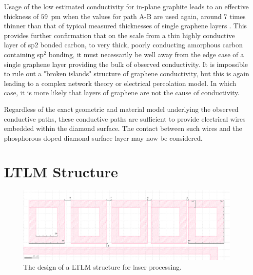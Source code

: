 \begin{refsection}
Usage of the low estimated conductivity for in-plane graphite leads to an effective thickness of $59$~\si{\pico\metre} when the values for path A-B are used again, around 7 times thinner than that of typical measured thicknesses of single graphene layers \cite{shearer2016}. This provides further confirmation that on the scale from a thin highly conductive layer of sp${2}$ bonded carbon, to very thick, poorly conducting amorphous carbon containing sp$^{2}$ bonding, it must necessarily be well away from the edge case of a single graphene layer providing the bulk of observed conductivity. It is impossible to rule out a "broken islands" structure of graphene conductivity, but this is again leading to a complex network theory or electrical percolation model. In which case, it is more likely that layers of graphene are not the cause of conductivity.

Regardless of the exact geometric and material model underlying the observed conductive paths, these conductive paths are sufficient to provide electrical wires embedded within the diamond surface. The contact between such wires and the phosphorous doped diamond surface layer may now be considered.

\section{LTLM Structure}

\begin{figure}[H]
    \centering
    \includegraphics[width=\linewidth]{Chapter7/Figs/Raster/ltlm_design.png}
    \caption{The design of a LTLM structure for laser processing.}
    \label{fig:ltlm_design}
\end{figure}


\end{refsection}
